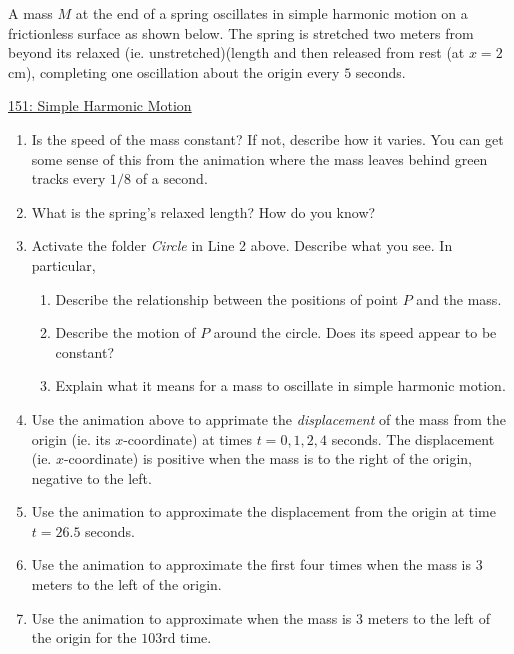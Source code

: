 \documentclass{ximera}
\begin{document}
\begin{example}  \label{Ex:LLL}
A mass $M$ at the end of a spring oscillates in simple harmonic motion on a frictionless surface as shown below. The spring is stretched two meters from beyond its relaxed (ie. unstretched)(length and then released from rest (at $x=2$ cm), completing one oscillation about the origin every $5$ seconds.

\begin{onlineOnly}
    \begin{center}
\end{center}
\end{onlineOnly}

\href{https://www.desmos.com/calculator/dcba538898}{151: Simple Harmonic Motion}

\begin{enumerate}
\item Is the speed of the mass constant? If not, describe how it varies. You can get some sense of this from the animation where the mass leaves behind green tracks every $1/8$ of a second.

\item What is the spring's relaxed length? How do you know?

\item Activate the folder \emph{Circle} in Line 2 above. Describe what you see. In particular,
\begin{enumerate}
\item Describe the relationship between the positions of point $P$ and the mass.

\item Describe the motion of $P$ around the circle. Does its speed appear to be constant?

\item Explain what it means for a mass to oscillate in simple harmonic motion. 
\end{enumerate}

\item Use the animation above to apprimate the \emph{displacement} of the mass from the origin (ie. its $x$-coordinate) at times $t=0, 1, 2, 4$ seconds. The displacement (ie. $x$-coordinate) is positive when the mass is to the right of the origin, negative to the left. 

\item Use the animation to approximate the displacement from the origin at time $t=26.5$ seconds.

\item Use the animation to approximate the first four times when the mass is $3$ meters to the left of the origin.

\item Use the animation to approximate when the mass is $3$ meters to the left of the origin for the $103$rd time.
\end{enumerate}
\end{example}
\end{document}
